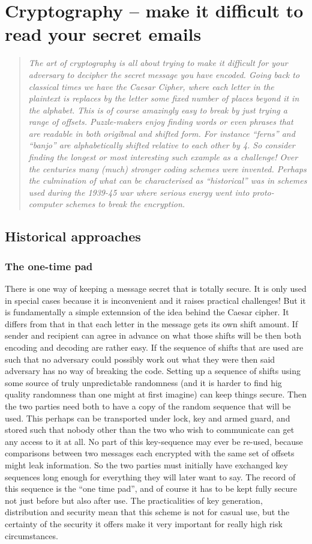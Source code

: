 \section{Cryptography -- make it difficult to read your secret emails}
\begin{quotation}\textit{
The art of cryptography is all about trying to make it difficult for
your adversary to decipher the secret message you have encoded. Going back
to classical times we have the Caesar Cipher, where each letter in the
plaintext is replaces by the letter some fixed number of places beyond it
in the alphabet. This is of course amazingly easy to break by just trying
a range of offsets. Puzzle-makers enjoy finding words or even phrases that
are readable in both origibnal and shifted form. For instance ``ferns'' and
``banjo'' are alphabetically shifted relative to each other by 4. So consider
finding the longest or most interesting such example as a challenge!
Over the centuries many (much) stronger coding schemes were invented. Perhaps
the culmination of what can be characterised as ``historical'' was in
schemes used during the 1939-45 war where serious energy went into
proto-computer schemes to break the encryption.
}\end{quotation}
\subsection{Historical approaches}
\subsubsection{The one-time pad}
There is one way of keeping a message secret that is totally secure. It is
only used in special cases because it is inconvenient and it raises practical
challenges! But it is fundamentally a simple extennsion of the idea behind the
Caesar cipher. It differs from that in that each letter in the message gets its
own shift amount. If sender and recipient can agree in advance on what those
shifts will be then both encoding and decoding are rather easy. If the sequence
of shifts that are used are such that no adversary could possibly work out
what they were then said adversary has no way of breaking the code. Setting up
a sequence of shifts using some source of truly unpredictable randomness (and it is
harder to find hig quality randomness than one might at first imagine) can keep
things secure. Then the two parties need both to have a copy of the random
sequence that will be used. This perhaps can be transported under lock, key and
armed guard, and stored such that nobody other than the two who wish to communicate
can get any access to it at all. No part of this key-sequence may ever be re-used,
because comparisons between two messages each encrypted with the same set of offsets
might leak information. So the two parties must initially have exchanged key sequences
long enough for everything they will later want to say. The record of this sequence
is the ``one time pad'', and of course it has to be kept fully secure not just before
but also after use. The practicalities of key generation, distribution and security
mean that this scheme is not for casual use, but the certainty of the security it
offers make it very important for really high risk circumstances.
